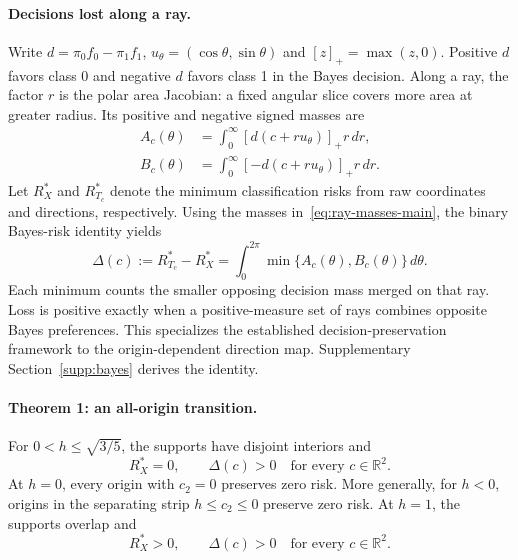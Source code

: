 \paragraph{Decisions lost along a ray.}
Write $d=\pi_0f_0-\pi_1f_1$, $u_\theta=(\cos\theta,\sin\theta)$ and $[z]_+=\max(z,0)$. Positive $d$ favors class 0 and negative $d$ favors class 1 in the Bayes decision. Along a ray, the factor $r$ is the polar area Jacobian: a fixed angular slice covers more area at greater radius. Its positive and negative signed masses are
\begin{equation}
\begin{aligned}
 A_c(\theta)&=\int_0^\infty[d(c+ru_\theta)]_+r\,dr,\\
 B_c(\theta)&=\int_0^\infty[-d(c+ru_\theta)]_+r\,dr.
\end{aligned}
\label{eq:ray-masses-main}
\end{equation}
Let $R_X^*$ and $R^*_{T_c}$ denote the minimum classification risks from raw coordinates and directions, respectively. Using the masses in~\eqref{eq:ray-masses-main}, the binary Bayes-risk identity yields
\begin{equation}
 \Delta(c):=R^*_{T_c}-R_X^*
 =\int_0^{2\pi}\min\{A_c(\theta),B_c(\theta)\}\,d\theta.
 \label{eq:ray-loss-main}
\end{equation}
Each minimum counts the smaller opposing decision mass merged on that ray. Loss is positive exactly when a positive-measure set of rays combines opposite Bayes preferences. This specializes the established decision-preservation framework \citep{Silva2012,Silva2024} to the origin-dependent direction map. Supplementary Section~\ref{supp:bayes} derives the identity.

\paragraph{Theorem 1: an all-origin transition.}
For $0<h\leq\sqrt{3/5}$, the supports have disjoint interiors and
\begin{equation}
 R_X^*=0,\qquad \Delta(c)>0
 \quad\text{for every }c\in\mathbb R^2.
 \label{eq:all-origin-disjoint}
\end{equation}
At $h=0$, every origin with $c_2=0$ preserves zero risk. More generally, for $h<0$, origins in the separating strip $h\leq c_2\leq0$ preserve zero risk. At $h=1$, the supports overlap and
\begin{equation}
 R_X^*>0,\qquad \Delta(c)>0
 \quad\text{for every }c\in\mathbb R^2.
 \label{eq:all-origin-overlap}
\end{equation}

